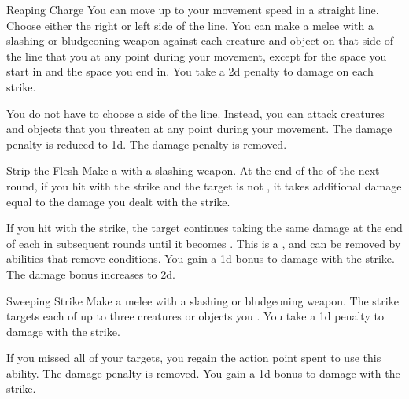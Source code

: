 {            \begin{ability}{Reaping Charge}
                You can move up to your movement speed in a straight line.
                Choose either the right or left side of the line.
                You can make a melee  with a slashing or bludgeoning weapon against each creature and object on that side of the line that you  at any point during your movement, except for the space you start in and the space you end in.
                You take a \minus2d penalty to damage on each strike.

                \rankline
                 You do not have to choose a side of the line.
                Instead, you can attack creatures and objects that you threaten at any point during your movement.
                 The damage penalty is reduced to \minus1d.
                 The damage penalty is removed.
            \end{ability}

            \begin{ability}{Strip the Flesh}
                Make a  with a slashing weapon.
                At the end of the  of the next round, if you hit with the strike and the target is not , it takes additional damage equal to the damage you dealt with the strike.

                \rankline
                 If you hit with the strike, the target continues taking the same damage at the end of each  in subsequent rounds until it becomes .
                This is a , and can be removed by abilities that remove conditions.
                 You gain a \plus1d bonus to damage with the strike.
                 The damage bonus increases to \plus2d.
            \end{ability}

            \begin{ability}{Sweeping Strike}
                Make a melee  with a slashing or bludgeoning weapon.
                The strike targets each of up to three creatures or objects you .
                You take a \minus1d penalty to damage with the strike.

                \rankline
                 If you missed all of your targets, you regain the action point spent to use this ability.
                 The damage penalty is removed.
                 You gain a \plus1d bonus to damage with the strike.
            \end{ability}

}
